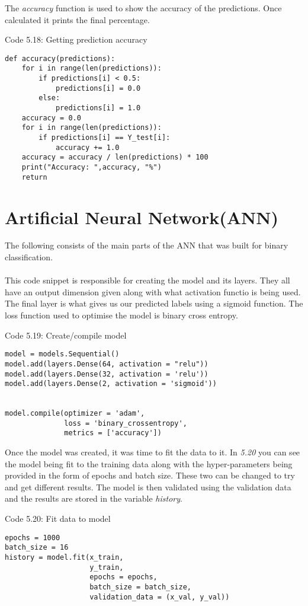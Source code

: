 The \textit{accuracy} function is used to show the accuracy of the predictions. Once calculated it prints the final percentage.
\begin{center} 
Code 5.18: Getting prediction accuracy
\end{center}
\begin{lstlisting}
def accuracy(predictions):
    for i in range(len(predictions)):
        if predictions[i] < 0.5:
            predictions[i] = 0.0
        else:
            predictions[i] = 1.0
    accuracy = 0.0
    for i in range(len(predictions)):
        if predictions[i] == Y_test[i]:
            accuracy += 1.0
    accuracy = accuracy / len(predictions) * 100
    print("Accuracy: ",accuracy, "%")
    return
\end{lstlisting}

\section{Artificial Neural Network(ANN)}
The following consists of the main parts of the ANN that was built for binary classification.
\\
\\
This code snippet is responsible for creating the model and its layers. They all have an output dimension given along with what activation functio is being used. The final layer is what gives us our predicted labels using a sigmoid function. 
The loss function used to optimise the model is binary cross entropy.
\begin{center} 
Code 5.19: Create/compile model
\end{center}
\begin{lstlisting}
model = models.Sequential()
model.add(layers.Dense(64, activation = "relu"))
model.add(layers.Dense(32, activation = 'relu'))
model.add(layers.Dense(2, activation = 'sigmoid'))


model.compile(optimizer = 'adam',
              loss = 'binary_crossentropy',
              metrics = ['accuracy'])
\end{lstlisting}

Once the model was created, it was time to fit the data to it. In \textit{5.20} you can see the model being fit to the training data along with the hyper-parameters being provided in the form of epochs and batch size. These two can be changed to try and get different results. The model is then validated using the validation data and the results are stored in the variable \textit{history}.
\begin{center}
Code 5.20: Fit data to model
\end{center}
\begin{lstlisting}
epochs = 1000
batch_size = 16
history = model.fit(x_train,
                    y_train,
                    epochs = epochs,
                    batch_size = batch_size,
                    validation_data = (x_val, y_val))
\end{lstlisting}



